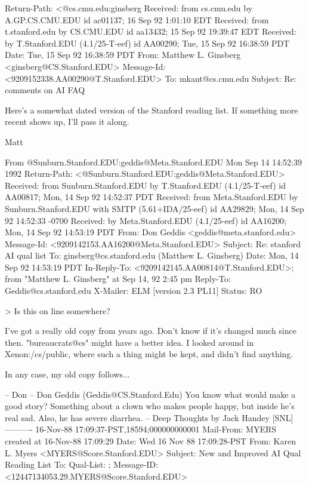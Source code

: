 Return-Path: <@cs.cmu.edu:ginsberg%
Received: from cs.cmu.edu by A.GP.CS.CMU.EDU id ac01137; 16 Sep 92 1:01:10 EDT
Received: from t.stanford.edu by CS.CMU.EDU id aa13432; 15 Sep 92 19:39:47 EDT
Received:  by T.Stanford.EDU (4.1/25-T-eef) id AA00290; Tue, 15 Sep 92 16:38:59 PDT
Date: Tue, 15 Sep 92 16:38:59 PDT
From: Matthew L. Ginsberg <ginsberg@CS.Stanford.EDU>
Message-Id: <9209152338.AA00290@T.Stanford.EDU>
To: mkant@cs.cmu.edu
Subject: Re: comments on AI FAQ

Here's a somewhat dated version of the Stanford reading list.  If
something more recent shows up, I'll pass it along.

						Matt

From @Sunburn.Stanford.EDU:geddis@Meta.Stanford.EDU Mon Sep 14 14:52:39 1992
Return-Path: <@Sunburn.Stanford.EDU:geddis@Meta.Stanford.EDU>
Received: from Sunburn.Stanford.EDU by T.Stanford.EDU (4.1/25-T-eef) id AA00817; Mon, 14 Sep 92 14:52:37 PDT
Received: from Meta.Stanford.EDU by Sunburn.Stanford.EDU with SMTP (5.61+IDA/25-eef) id AA29829; Mon, 14 Sep 92 14:52:33 -0700
Received:  by Meta.Stanford.EDU (4.1/25-eef) id AA16200; Mon, 14 Sep 92 14:53:19 PDT
From: Don Geddis <geddis@meta.stanford.edu>
Message-Id: <9209142153.AA16200@Meta.Stanford.EDU>
Subject: Re: stanford AI qual list
To: ginsberg@cs.stanford.edu (Matthew L. Ginsberg)
Date: Mon, 14 Sep 92 14:53:19 PDT
In-Reply-To: <9209142145.AA00814@T.Stanford.EDU>; from "Matthew L. Ginsberg" at Sep 14, 92 2:45 pm
Reply-To: Geddis@cs.stanford.edu
X-Mailer: ELM [version 2.3 PL11]
Status: RO

> Is this on line somewhere?

I've got a really old copy from years ago.  Don't know if it's changed
much since then.  "bureaucrats@cs" might have a better idea.  I looked
around in Xenon:/cs/public, where such a thing might be kept, and didn't
find anything.

In any case, my old copy follows...

	-- Don
-- 
Don Geddis (Geddis@CS.Stanford.Edu)
You know what would make a good story?  Something about a clown who makes
people happy, but inside he's real sad.  Also, he has severe diarrhea.
	--  Deep Thoughts by Jack Handey [SNL]
----------
16-Nov-88 17:09:37-PST,18594;000000000001
Mail-From: MYERS created at 16-Nov-88 17:09:29
Date: Wed 16 Nov 88 17:09:28-PST
From: Karen L. Myers <MYERS@Score.Stanford.EDU>
Subject: New and Improved AI Qual Reading List
To: Qual-List: ;
Message-ID: <12447134053.29.MYERS@Score.Stanford.EDU>




